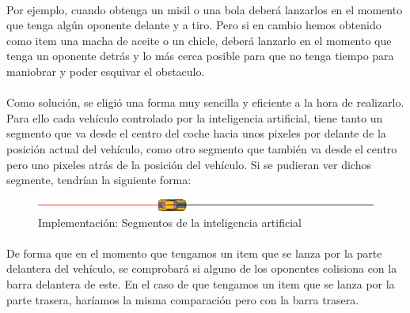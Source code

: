 \paragraph{}
Por ejemplo, cuando obtenga un misil o una bola deberá lanzarlos en el momento que tenga algún oponente delante y a tiro. Pero si
en cambio hemos obtenido como item una macha de aceite o un chicle, deberá lanzarlo en el momento que tenga un oponente detrás
y lo más cerca posible para que no tenga tiempo para maniobrar y poder esquivar el obstaculo.

\paragraph{}
Como solución, se eligió una forma muy sencilla y eficiente a la hora de realizarlo. Para ello cada vehículo controlado por la
inteligencia artificial, tiene tanto un segmento que va desde el centro del coche hacia unos pixeles por delante de la posición
actual del vehículo, como otro segmento que también va desde el centro pero uno pixeles atrás de la posición del vehículo. 
Si se pudieran ver dichos segmente, tendrían la siguiente forma:

\begin{figure}[H]
  \label{ia_segmentos}
  \begin{center}
    \includegraphics[scale=0.8]{imagenes/ia_segmentos.png}
  \end{center}
  \caption{Implementación: Segmentos de la inteligencia artificial}
\end{figure}

\paragraph{}
De forma que en el momento que tengamos un item que se lanza por la parte delantera del vehículo, se comprobará si alguno de los 
oponentes colisiona con la barra delantera de este. En el caso de que tengamos un item que se lanza por la parte trasera, haríamos
la misma comparación pero con la barra trasera.
